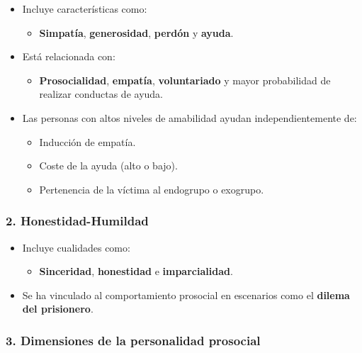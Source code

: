 \documentclass[
]{book}
\providecommand{\tightlist}{%
  \setlength{\itemsep}{0pt}\setlength{\parskip}{0pt}}
\begin{document}
\begin{itemize}
\tightlist
\item
  Incluye características como:

  \begin{itemize}
  \tightlist
  \item
    \textbf{Simpatía}, \textbf{generosidad}, \textbf{perdón} y \textbf{ayuda}.
  \end{itemize}
\item
  Está relacionada con:

  \begin{itemize}
  \tightlist
  \item
    \textbf{Prosocialidad}, \textbf{empatía}, \textbf{voluntariado} y mayor probabilidad de realizar conductas de ayuda.
  \end{itemize}
\item
  Las personas con altos niveles de amabilidad ayudan independientemente de:

  \begin{itemize}
  \tightlist
  \item
    Inducción de empatía.
  \item
    Coste de la ayuda (alto o bajo).
  \item
    Pertenencia de la víctima al endogrupo o exogrupo.
  \end{itemize}
\end{itemize}

\subsubsection{\texorpdfstring{2. \textbf{Honestidad-Humildad}}{2. Honestidad-Humildad}}\label{honestidad-humildad}

\begin{itemize}
\tightlist
\item
  Incluye cualidades como:

  \begin{itemize}
  \tightlist
  \item
    \textbf{Sinceridad}, \textbf{honestidad} e \textbf{imparcialidad}.
  \end{itemize}
\item
  Se ha vinculado al comportamiento prosocial en escenarios como el \textbf{dilema del prisionero}.
\end{itemize}

\subsubsection{\texorpdfstring{3. \textbf{Dimensiones de la personalidad prosocial}}{3. Dimensiones de la personalidad prosocial}}\label{dimensiones-de-la-personalidad-prosocial}
\end{document}
